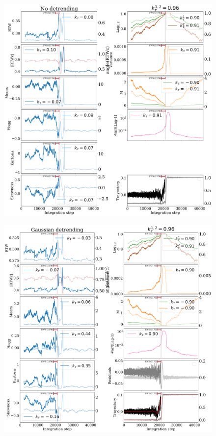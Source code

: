 \begin{figure}
	\centering
	\includegraphics[width=0.8\linewidth]{Images/Metrics/custom_bifurcation/No_det_additive}
	\caption{}
	\label{fig:nodetadditive}
\end{figure}
\begin{figure}
	\centering
	\includegraphics[width=0.8\linewidth]{Images/Metrics/custom_bifurcation/Gdet_additive}
	\caption{}
	\label{fig:gdetadditive}
\end{figure}





